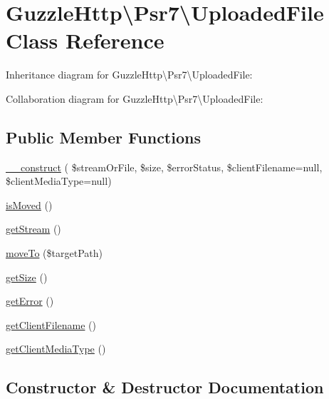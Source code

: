 \hypertarget{classGuzzleHttp_1_1Psr7_1_1UploadedFile}{}\section{Guzzle\+Http\textbackslash{}Psr7\textbackslash{}Uploaded\+File Class Reference}
\label{classGuzzleHttp_1_1Psr7_1_1UploadedFile}


Inheritance diagram for Guzzle\+Http\textbackslash{}Psr7\textbackslash{}Uploaded\+File\+:


Collaboration diagram for Guzzle\+Http\textbackslash{}Psr7\textbackslash{}Uploaded\+File\+:
\subsection*{Public Member Functions}
\begin{DoxyCompactItemize}
\item 
\hyperlink{classGuzzleHttp_1_1Psr7_1_1UploadedFile_a118dab07d8bf99ad3664f9b1066ea044}{\+\_\+\+\_\+construct} ( \$stream\+Or\+File, \$size, \$error\+Status, \$client\+Filename=null, \$client\+Media\+Type=null)
\item 
\hyperlink{classGuzzleHttp_1_1Psr7_1_1UploadedFile_a1239a84cc43c30dd3ecfeac12a84d945}{is\+Moved} ()
\item 
\hyperlink{classGuzzleHttp_1_1Psr7_1_1UploadedFile_a4626779cebe28308009f37701ad0d982}{get\+Stream} ()
\item 
\hyperlink{classGuzzleHttp_1_1Psr7_1_1UploadedFile_a5279b64228742deb9e0ba074df4d0d8e}{move\+To} (\$target\+Path)
\item 
\hyperlink{classGuzzleHttp_1_1Psr7_1_1UploadedFile_ac21d09bd109893eb961d927e96693079}{get\+Size} ()
\item 
\hyperlink{classGuzzleHttp_1_1Psr7_1_1UploadedFile_abf88819e67fdc112aa01fcd722e784d4}{get\+Error} ()
\item 
\hyperlink{classGuzzleHttp_1_1Psr7_1_1UploadedFile_a6565180d087f60e0645d4e29b76529fd}{get\+Client\+Filename} ()
\item 
\hyperlink{classGuzzleHttp_1_1Psr7_1_1UploadedFile_af579a9f2b8a3867da29466cfbad22a4e}{get\+Client\+Media\+Type} ()
\end{DoxyCompactItemize}


\subsection{Constructor \& Destructor Documentation}
\mbox{\label{classGuzzleHttp_1_1Psr7_1_1UploadedFile_a118dab07d8bf99ad3664f9b1066ea044}} 

